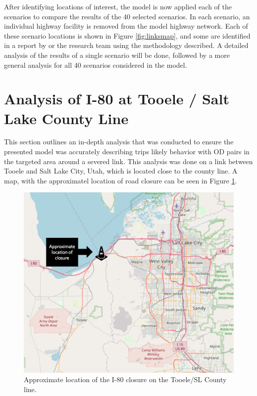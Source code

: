 After identifying locations of interest, the model is now applied each of the scenarios to compare the results of the 40 selected scenarios. In each scenario, an individual highway
facility is removed from the model highway network. Each of these scenario locations is shown in Figure \ref{fig:linksmap}, and some are identified in a report by
\citet{aem2017,riskanalysis} or the research team using the methodology described. A detailed analysis of the results of a single scenario will be done, followed by a
more general analysis for all 40 scenarios considered in the model.

\section{Analysis of I-80 at Tooele / Salt Lake County Line}

This section outlines an in-depth analysis that was conducted to ensure
the presented model was accurately describing trips likely behavior with OD pairs in the
targeted area around a severed link. This analysis was done on a link between
Tooele and Salt Lake City, Utah, which is located close to the county line. A map, with the approximatel
location of road closure can be seen in Figure \ref{fig:tooelemapwithcone}.

\begin{figure}

{\centering \includegraphics[width=0.75\linewidth]{figures/chapter4/tooelemapwithcone.png}

}

\caption{Approximate location of the I-80 closure on the Tooele/SL County line.}\label{fig:tooelemapwithcone}
\end{figure}

